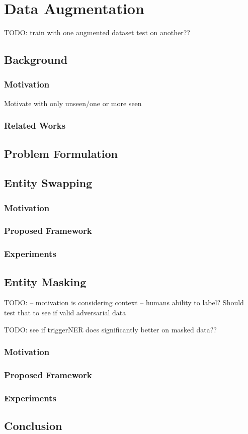 \chapter{Data Augmentation}
TODO:
train with one augmented dataset test on another??

\section{Background}
\subsection{Motivation}
Motivate with only unseen/one or more seen

\subsection{Related Works}

\section{Problem Formulation}

\section{Entity Swapping}

\subsection{Motivation}

\subsection{Proposed Framework}

\subsection{Experiments}



\section{Entity Masking}
TODO:
-- motivation is considering context
-- humans ability to label? Should test that to see if valid adversarial data


TODO: see if triggerNER does significantly better on masked  data??

\subsection{Motivation}

\subsection{Proposed Framework}

\subsection{Experiments}




\section{Conclusion}